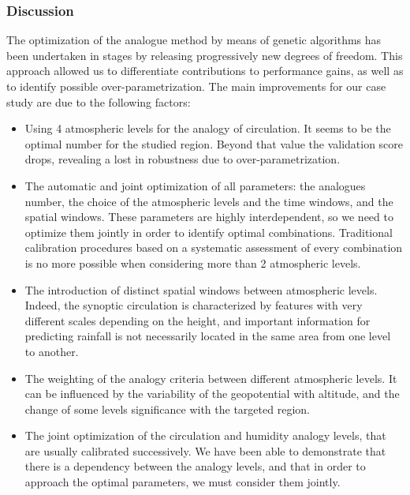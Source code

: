 \documentclass[twocol]{ametsoc}
\begin{document}


\subsubsection{Discussion}

The optimization of the analogue method by means of genetic algorithms has been undertaken in stages by releasing progressively new degrees of freedom. This approach allowed us to differentiate contributions to performance gains, as well as to identify possible over-parametrization. The main improvements for our case study are due to the following factors:

\begin{itemize}
	\item Using 4 atmospheric levels for the analogy of circulation. It seems to be the optimal number for the studied region. Beyond that value the validation score drops, revealing a lost in robustness due to over-parametrization.
	\item The automatic and joint optimization of all parameters: the analogues number, the choice of the atmospheric levels and the time windows, and the spatial windows. These parameters are highly interdependent, so we need to optimize them jointly in order to identify optimal combinations. Traditional calibration procedures based on a systematic assessment of every combination is no more possible when considering more than 2 atmospheric levels.
	\item The introduction of distinct spatial windows between atmospheric levels. Indeed, the synoptic circulation is characterized by features with very different scales depending on the height, and important information for predicting rainfall is not necessarily located in the same area from one level to another.
	\item The weighting of the analogy criteria between different atmospheric levels. It can be influenced by the variability of the geopotential with altitude, and the change of some levels significance with the targeted region. 
	\item The joint optimization of the circulation and humidity analogy levels, that are usually calibrated successively. We have been able to demonstrate that there is a dependency between the analogy levels, and that in order to approach the optimal parameters, we must consider them jointly.
\end{itemize}
	
\end{document}
